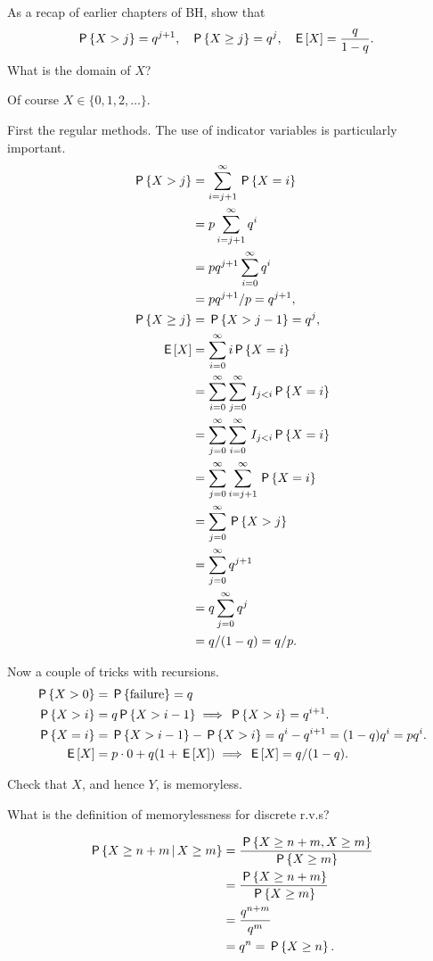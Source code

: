 \documentclass[a4paper,12pt]{article}
\begin{document}
\begin{exercise}
As a recap of earlier chapters of BH, show that
\begin{align}
  \label{eq:9}
\,\mathsf{P}\left\{X>j\right\} &= q^{j+1}, &\,\mathsf{P}\left\{X\geq j\right\} &=q^j,& \,\mathsf{E}\left[X\right]&=\frac q{1-q}.
 \end{align}
What is the domain of $X$?
\begin{solution}
Of course $X \in \{0, 1, 2, \ldots\}$.

First the regular methods. The use of indicator variables is particularly important.
  \begin{align}
    \label{eq:5}
\,\mathsf{P}\left\{X>j\right\}    
&= \sum_{i=j+1}^{\infty} \,\mathsf{P}\left\{X=i\right\} \\
&= p\sum_{i=j+1}^{\infty} q^{i} \\
&= pq^{j+1}\sum_{i=0}^{\infty} q^{i} \\
&= pq^{j+1}/p = q^{j+1},\\
  \,\mathsf{P}\left\{X\geq j\right\}  &= \,\mathsf{P}\left\{X>j-1\right\} = q^{j}, \\
\,\mathsf{E}\left[X\right] 
&= \sum_{i=0}^{\infty} i\,\mathsf{P}\left\{X=i\right\} \\
&=  \sum_{i=0}^{\infty} \sum_{j=0}^{\infty} \,I_{j<i} \,\mathsf{P}\left\{X=i\right\} \\
&=  \sum_{j=0}^{\infty} \sum_{i=0}^{\infty} \,I_{j<i} \,\mathsf{P}\left\{X=i\right\} \\
&=  \sum_{j=0}^{\infty} \sum_{i=j+1}^{\infty}  \,\mathsf{P}\left\{X=i\right\} \\
&=  \sum_{j=0}^{\infty}  \,\mathsf{P}\left\{X>j\right\} \\
&=  \sum_{j=0}^{\infty}  q^{j+1}\\
&=  q \sum_{j=0}^{\infty}  q^{j}\\
&=  q/(1-q) = q/p.
  \end{align}


Now a couple of tricks with recursions.
\begin{align}
  \label{eq:8}
\,\mathsf{P}\left\{X>0\right\} &= \,\mathsf{P}\left\{\textrm{failure}\right\} = q\\
\,\mathsf{P}\left\{X>i\right\} &= q \,\mathsf{P}\left\{X>i-1\right\} \implies \,\mathsf{P}\left\{X>i\right\}=q^{i+1}.\\
\,\mathsf{P}\left\{X=i\right\} &= \,\mathsf{P}\left\{X>i-1\right\} - \,\mathsf{P}\left\{X>i\right\} = q^{i}-q^{i+1} = (1-q)q^i = p q^i.\\
\,\mathsf{E}\left[X\right] &= p\cdot 0 + q(1+\,\mathsf{E}\left[X\right]) \implies \,\mathsf{E}\left[X\right] = q/(1-q).
\end{align}

\end{solution}
\end{exercise}

\begin{exercise}
Check that $X$, and hence $Y$, is memoryless.
\begin{hint}
What is the definition of memorylessness for discrete r.v.s?  
\end{hint}
\begin{solution}
  \begin{align}
    \label{eq:13}
\,\mathsf{P}\left\{X\geq n+m\,\middle|\, X\geq m\right\} 
&= \frac{ \,\mathsf{P}\left\{X\geq n+m,  X\geq m\right\}}{\,\mathsf{P}\left\{X\geq m\right\}} \\
&= \frac{ \,\mathsf{P}\left\{X\geq n+m\right\}}{\,\mathsf{P}\left\{X\geq m\right\}} \\
&= \frac{ q^{n+m}}{q^m} \\
&= q^n= \,\mathsf{P}\left\{X\geq n\right\}.
  \end{align}
\end{solution}
\end{exercise}
\end{document}
